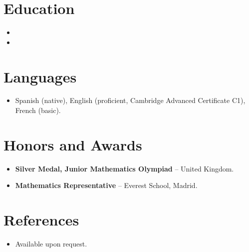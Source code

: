 \documentclass[11pt,a4paper,sans]{moderncv}
\begin{document}

\section{Education}
\vspace{1pt}
\begin{itemize}

\item{}

\vspace{3pt}

\item{}

\end{itemize}


\section{Languages}
\vspace{1pt}
\begin{itemize}
\item Spanish (native), English (proficient, Cambridge Advanced Certificate C1), French (basic).
\end{itemize}


\section{Honors and Awards}
\vspace{1pt}
\begin{itemize}
\item{\textbf{Silver Medal, Junior Mathematics Olympiad} -- United Kingdom.}
\item{\textbf{Mathematics Representative} -- Everest School, Madrid.}
\end{itemize}


\section{References}
\vspace{1pt}
\begin{itemize}
\item{Available upon request.}
\end{itemize}
\end{document}
